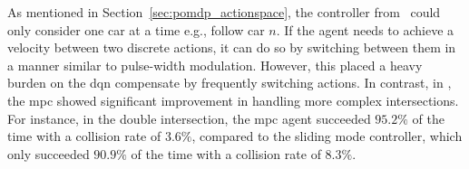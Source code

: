As mentioned in Section~\ref{sec:pomdp_actionspace}, the controller from \paperLSTM \ could only consider one car at a time e.g., follow car $n$. 
If the agent needs to achieve a velocity between two discrete actions, it can do so by switching between them in a manner similar to pulse-width modulation. However, this placed a heavy burden on the \gls{dqn} compensate by frequently switching actions. 
In contrast, in \paperMPC, the \gls{mpc} showed significant improvement in handling more complex intersections.
For instance, in the double intersection, the \gls{mpc} agent succeeded $95.2\%$ of the time with a collision rate of $3.6\%$, compared to the sliding mode controller, which only succeeded $90.9\%$ of the time with a collision rate of $8.3\%$. 




